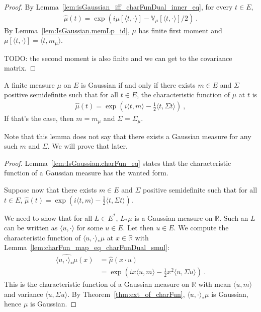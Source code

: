 \begin{proof}
By Lemma~\ref{lem:isGaussian_iff_charFunDual_inner_eq}, for every $t \in E$,
\begin{align*}
  \hat{\mu}(t) = \exp\left(i \mu[\langle t, \cdot \rangle] - \mathbb{V}_\mu[\langle t, \cdot \rangle] / 2\right) \: .
\end{align*}
By Lemma~\ref{lem:IsGaussian.memLp_id}, $\mu$ has finite first moment and $\mu[\langle t, \cdot \rangle] = \langle t, m_\mu \rangle$.

TODO: the second moment is also finite and we can get to the covariance matrix.
\end{proof}


\begin{lemma}\label{lem:isGaussian_iff_charFun_eq}
A finite measure $\mu$ on $E$ is Gaussian if and only if there exists $m \in E$ and $\Sigma$ positive semidefinite such that for all $t \in E$, the characteristic function of $\mu$ at $t$ is
\begin{align*}
  \hat{\mu}(t) = \exp\left(i \langle t, m \rangle - \frac{1}{2} \langle t, \Sigma t \rangle\right) \: ,
\end{align*}
If that's the case, then $m = m_\mu$ and $\Sigma = \Sigma_\mu$.
\end{lemma}

Note that this lemma does not say that there exists a Gaussian measure for any such $m$ and $\Sigma$.
We will prove that later.

\begin{proof}
Lemma~\ref{lem:IsGaussian.charFun_eq} states that the characteristic function of a Gaussian measure has the wanted form.

Suppose now that there exists $m \in E$ and $\Sigma$ positive semidefinite such that for all $t \in E$, $\hat{\mu}(t) = \exp\left(i \langle t, m \rangle - \frac{1}{2} \langle t, \Sigma t \rangle\right)$.

We need to show that for all $L \in E^*$, $L_*\mu$ is a Gaussian measure on $\mathbb{R}$.
Such an $L$ can be written as $\langle u, \cdot \rangle$ for some $u \in E$.
Let then $u \in E$. We compute the characteristic function of $\langle u, \cdot\rangle_*\mu$ at $x \in \mathbb{R}$ with Lemma~\ref{lem:charFun_map_eq_charFunDual_smul}:
\begin{align*}
  \widehat{\langle u, \cdot\rangle_*\mu}(x)
  &= \hat{\mu}(x \cdot u)
  \\
  &= \exp\left(i x \langle u, m \rangle - \frac{1}{2} x^2 \langle u, \Sigma u \rangle\right)
  \: .
\end{align*}
This is the characteristic function of a Gaussian measure on $\mathbb{R}$ with mean $\langle u, m \rangle$ and variance $\langle u, \Sigma u \rangle$.
By Theorem~\ref{thm:ext_of_charFun}, $\langle u, \cdot\rangle_*\mu$ is Gaussian, hence $\mu$ is Gaussian.
\end{proof}


